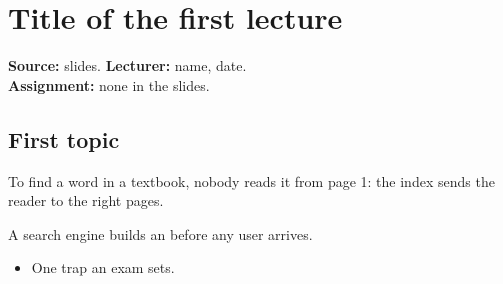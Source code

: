 \chapter{Title of the first lecture}

\begin{lecturecard}
\textbf{Source:} slides. \textbf{Lecturer:} name, date.\\
\textbf{Assignment:} none in the slides.
\end{lecturecard}

\section{First topic}

\begin{intuition}
To find a word in a textbook, nobody reads it from page 1: the index sends the reader to the right pages.
\end{intuition}

A search engine builds an  before any user arrives.

\begin{traps}
\begin{itemize}
\item One trap an exam sets.
\end{itemize}
\end{traps}
